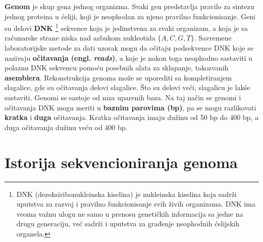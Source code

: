 \documentclass[12pt,oneside]{memoir}
\begin{document}
 \textbf{Genom} je skup gena jednog organizma. Svaki gen predstavlja pravilo za sintezu jednog proteina u ćeliji, koji je neophodan za njeno pravilno funkcionisanje. Geni su delovi \textbf{DNK} \footnote{DNK (dezoksiribonukleinska kiselina) je nukleinska kiselina koja sadrži uputstva za razvoj i pravilno funkcionisanje svih živih organizama. DNK ima veoma važnu ulogu ne samo u prenosu genetičkih informacija sa jedne na drugu generaciju, već sadrži i uputstva za građenje neophodnih ćelijskih organela.} sekvence koja je jedinstvena za svaki organizam, a koja je sa računarske strane niska nad azbukom nukleotida $\{A, C, G, T\}$. Savremene laboratorijske metode za dati uzorak mogu da očitaju podsekvence DNK koje se nazivaju \textbf{očitavanja (engl. \textit{reads})}, a koje je nakon toga neophodno sastaviti u polaznu DNK sekvencu pomoću posebnih alata za sklapanje, takozvanih \textbf{asemblera}. Rekonstrukcija genoma može se uporediti sa kompletiranjem slagalice, gde su očitavanja delovi slagalice. Što su delovi veći, slagalicu je lakše sastaviti. Genomi se sastoje od niza uparenih baza. Na taj način se genomi i očitavanja DNK mogu meriti u \textbf{baznim parovima (bp)}, pa se mogu razlikovati \textbf{kratka} i \textbf{duga} očitavanja. Kratka očitavanja imaju dužinu od 50 bp do 400 bp, a duga očitavanja dužinu veću od 400 bp.

\begin{comment}
Rekonstrukcija genoma kroz sekvencioniranje DNK je veoma važan problem u genomici. Postojeće biotehnologije ne mogu proći kroz ceo hromozom, jer je predugačak. Umesto toga, genom se rekonstruiše indirektno. Prvo, vrši se razbijanje genoma na DNK fragmente koristeći pristup očitavanja celog sekvencioniranog genoma (engl. \textit{whole genome shotgun approach}). Zatim se pomoću mašine za sekvencioniranje na osnovu fragmenata vrši dekodiranje DNK sekvence. Ove DNK sekvence se nazivaju \textbf{očitavanja (engl. \textit{reads})}. Usled slučajnog uzorkovanja , ekstahovana očitavanja pokrivaju ceo genom ravnomerno. Lepljenjem ovih očitavanja možemo računski rekonstruisati genom. Ovaj proces je poznat kao \textbf{\textit{de novo} genomsko sekvencioniranje}.
\end{comment}

\newpage

\section{Istorija sekvencioniranja genoma}
\end{document}
